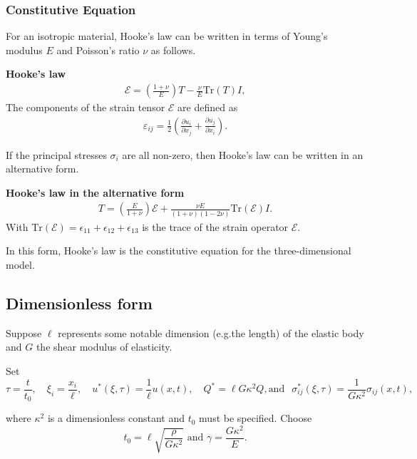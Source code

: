 \subsubsection*{Constitutive Equation}
For an isotropic material, Hooke's law can be written in terms of Young's modulus $E$ and Poisson's ratio $\nu$ as follows.

\textbf{Hooke's law}
\begin{eqnarray}
	\mathcal{E} = \left( \frac{1+\nu}{E} \right)T - \frac{\nu}{E}\textrm{Tr}(T)I,  \label{eq:3D_Model:HL}
\end{eqnarray} The components of the strain tensor $\mathcal{E}$ are defined as
\begin{eqnarray}
	\varepsilon_{ij} = \frac{1}{2}\left( \frac{\partial u_i}{\partial x_j} + \frac{\partial u_j}{\partial x_i} \right). \label{eq:3D_Model:Strain}
\end{eqnarray}\label{sym:varepsilonij}

If the principal stresses $\sigma_i$ are all non-zero, then Hooke's law can be written in an alternative form.

\textbf{Hooke's law in the alternative form}
\begin{eqnarray}
	T = \left( \frac{E}{1+\nu} \right)\mathcal{E} + \frac{\nu E}{(1+\nu)(1-2\nu)}\textrm{Tr}(\mathcal{E})I \label{eq:3D_Model:CE}.
\end{eqnarray}
With $\textrm{Tr}(\mathcal{E}) = \epsilon_{11} + \epsilon_{12} + \epsilon_{13}$ is the trace of the strain operator $\mathcal{E}$.

In this form, Hooke's law is the constitutive equation for the three-dimensional model.

\subsection{Dimensionless form} \label{ssec:3D_Model:DimensionlessForm}
Suppose $\ell$ represents some notable dimension (e.g.the length) of the elastic body 
and $G$ the shear modulus of elasticity.

Set \[\tau = \frac{t}{t_0},\quad \xi_i = \frac{x_i}{\ell},\quad {u}^*(\xi,\tau) = \frac{1}{\ell}{u}(x,t), \quad Q^{*} = \ell G \kappa^2 Q, \text{and} \ \,\,\, \sigma_{ij}^*(\xi,\tau) = \frac{1}{G\kappa^2}\sigma_{ij}(x,t),\]\label{sym:t}\label{sym:G}\label{sym:tau}\label{sym:xi}\label{sym:Qstar}\label{sym:sigmaijstar}\label{sym:ell}\label{sym:kappa2}

where $\kappa^2$ is a dimensionless constant and $t_0$ must be specified. Choose \[t_0 = \ell\sqrt{\frac{\rho}{G\kappa^2}} \textrm{ and } \gamma= \frac{G\kappa^2}{E}.\]

